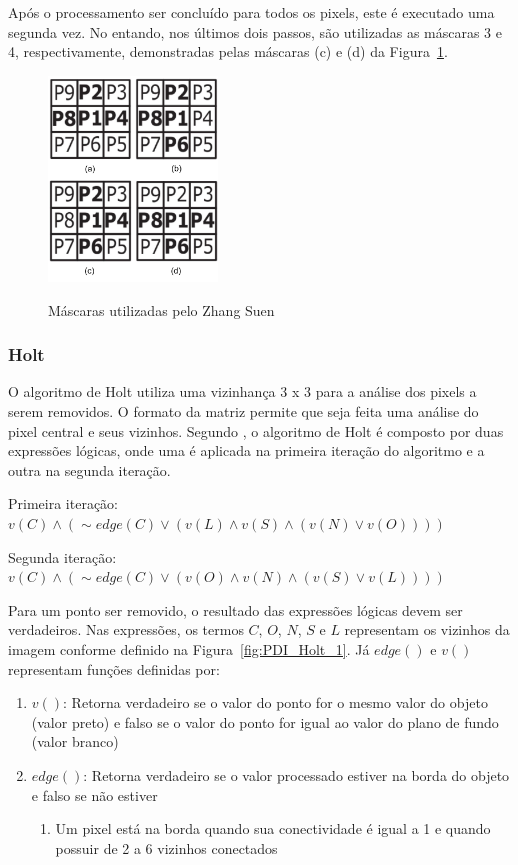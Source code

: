 \documentclass[12pt,oneside,a4paper,english,french,spanish,brazil,]{abntex2}
\begin{document}
Após o processamento ser concluído para todos os pixels, este é executado uma segunda vez. No entando, nos últimos dois passos, são utilizadas as máscaras 3 e 4, respectivamente, demonstradas pelas máscaras (c) e (d) da Figura~\ref{fig:PDI_Zhang}.

\begin{figure}[ht]
\centering
\caption{Máscaras utilizadas pelo Zhang Suen}
\includegraphics[width=0.4\textwidth]{imagens/PDI_Zhang.pdf}
\label{fig:PDI_Zhang}
\end{figure}

\subsubsection{Holt}

O algoritmo de Holt \cite{holt:1987} utiliza uma vizinhança 3 x 3 para a análise dos pixels a serem removidos. O formato da matriz permite que seja feita uma análise do pixel central e seus vizinhos. Segundo \citet{guilherme:2007}, o algoritmo de Holt é composto por duas expressões lógicas, onde uma é aplicada na primeira iteração do algoritmo e a outra na segunda iteração.


Primeira iteração: 
\(v(C) \wedge (\sim edge(C) \vee (v(L) \wedge v(S) \wedge (v(N) \vee v(O))))\)

Segunda iteração:
\(v(C) \wedge (\sim edge(C) \vee (v(O) \wedge v(N) \wedge (v(S) \vee v(L))))\)

Para um ponto ser removido, o resultado das expressões lógicas devem ser verdadeiros. Nas expressões, os termos \(C\), \(O\), \(N\), \(S\) e \(L\) representam os vizinhos da imagem conforme definido na Figura~\ref{fig:PDI_Holt_1}. Já \(edge()\) e \(v()\) representam funções definidas por:
\begin{enumerate}
\item \(v()\): Retorna verdadeiro se o valor do ponto for o mesmo valor do objeto (valor preto) e falso se o valor do ponto for igual ao valor do plano de fundo (valor branco)
\item \(edge()\): Retorna verdadeiro se o valor processado estiver na borda do objeto e falso se não estiver
\begin{enumerate}[label*=\roman*.]
    \item Um pixel está na borda quando sua conectividade é igual a 1 e quando possuir de 2 a 6 vizinhos conectados
  \end{enumerate}
\end{enumerate}
\end{document}
